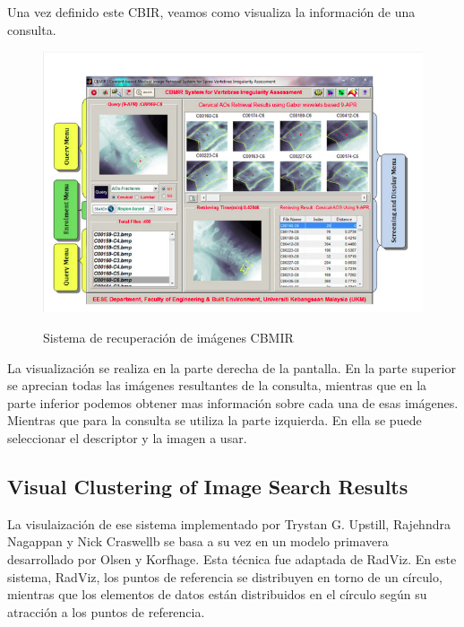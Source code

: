 Una vez definido este CBIR, veamos como visualiza la información de una consulta.\\

\begin{figure}[H] %
\centering
\includegraphics[scale=0.5]{imagenes/CBMIR.png}  %
\label{CBMIR}
\caption{Sistema de recuperación de imágenes CBMIR}
\end{figure}

La visualización se realiza en la parte derecha de la pantalla. En la parte superior se aprecian todas las imágenes resultantes de la consulta, mientras que en la parte inferior podemos obtener mas información sobre cada una de esas imágenes.\\

Mientras que para la consulta se utiliza la parte izquierda. En ella se puede seleccionar el descriptor y la imagen a usar.\\

\subsection{Visual Clustering of Image Search Results}

La visulaización de ese sistema implementado por Trystan G. Upstill, Rajehndra Nagappan y Nick Craswellb se basa a su vez en un modelo primavera desarrollado por Olsen y Korfhage. Esta técnica fue adaptada de RadViz. En este sistema, RadViz, los puntos de referencia se distribuyen en torno de un círculo, mientras que los elementos de datos están distribuidos en el círculo según su atracción a los puntos de referencia.\\

